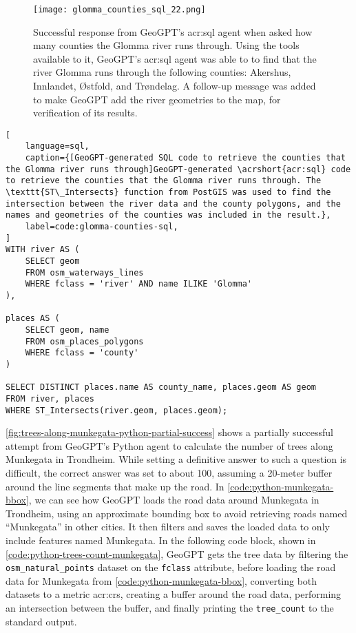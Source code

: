 \begin{figure}[htbp]
    \centering
    \texttt{[image: glomma\_counties\_sql\_22.png]}
    \caption[Successful response from GeoGPT's SQL agent when asked how many counties the Glomma river runs through]{Successful response from GeoGPT's \acrshort{acr:sql} agent when asked how many counties the Glomma river runs through. Using the tools available to it, GeoGPT's \acrshort{acr:sql} agent was able to to find that the river Glomma runs through the following counties: Akershus, Innlandet, Østfold, and Trøndelag. A follow-up message was added to make GeoGPT add the river geometries to the map, for verification of its results.}
    \label{fig:glomma-counties-sql-successful}
\end{figure}

\FloatBarrier

\begin{lstlisting}[
    language=sql,
    caption={[GeoGPT-generated SQL code to retrieve the counties that the Glomma river runs through]GeoGPT-generated \acrshort{acr:sql} code to retrieve the counties that the Glomma river runs through. The \texttt{ST\_Intersects} function from PostGIS was used to find the intersection between the river data and the county polygons, and the names and geometries of the counties was included in the result.},
    label=code:glomma-counties-sql,
]
WITH river AS (
    SELECT geom 
    FROM osm_waterways_lines 
    WHERE fclass = 'river' AND name ILIKE 'Glomma'
),

places AS (
    SELECT geom, name 
    FROM osm_places_polygons 
    WHERE fclass = 'county'
)

SELECT DISTINCT places.name AS county_name, places.geom AS geom
FROM river, places
WHERE ST_Intersects(river.geom, places.geom);    
\end{lstlisting}

\FloatBarrier

\autoref{fig:trees-along-munkegata-python-partial-success} shows a partially successful attempt from GeoGPT's Python agent to calculate the number of trees along Munkegata in Trondheim. While setting a definitive answer to such a question is difficult, the correct answer was set to about 100, assuming a 20-meter buffer around the line segments that make up the road. In \autoref{code:python-munkegata-bbox}, we can see how GeoGPT loads the road data around Munkegata in Trondheim, using an approximate bounding box to avoid retrieving roads named \enquote{Munkegata} in other cities. It then filters and saves the loaded data to only include features named Munkegata. In the following code block, shown in \autoref{code:python-trees-count-munkegata}, GeoGPT gets the tree data by filtering the \texttt{osm\_natural\_points} dataset on the \texttt{fclass} attribute, before loading the road data for Munkegata from \autoref{code:python-munkegata-bbox}, converting both datasets to a metric \acrshort{acr:crs}, creating a buffer around the road data, performing an intersection between the buffer, and finally printing the \texttt{tree\_count} to the standard output.

